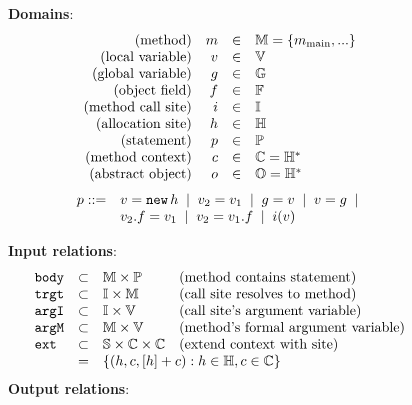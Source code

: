 \begin{figure*}
\begin{minipage}{3.3in}
{\bf Domains}: \\
\[
\begin{array}{rrcl}
\mbox{{(method)}}                  & m   &\in & {\mathbb M} = \{ m_\text{main}, ... \}\\
\mbox{{(local variable)}}          & v   &\in & {\mathbb V} \\
\mbox{{(global variable)}}         & g   &\in & {\mathbb G}  \\
\mbox{{(object field)}}            & f   &\in & {\mathbb F}  \\
\mbox{{(method call site)}}        & i   &\in & {\mathbb I} \\
\mbox{{(allocation site)}}         & h   &\in & {\mathbb H} \\
\mbox{{(statement)}}               & p   &\in & {\mathbb P} \\
\mbox{{(method context)}}          & c   &\in& {\mathbb C} = {\mathbb H}^* \\
\mbox{{(abstract object)}}         & o   &\in& {\mathbb O} = {\mathbb H}^* \\
\end{array}
\]
\[
\begin{array}{ll}
p ::= & v = \text{\tt new}\,h \;\mid\; v_2 = v_1 \;\mid\; g = v \;\mid\; v = g \;\mid\; \\
      & v_2.f = v_1 \;\mid\; v_2 = v_1.f  \;\mid\; i(v)
\end{array}
\]
\end{minipage}
\begin{minipage}{3.7in}
{\bf Input relations}: \\
\[ \begin{array}{lcll}
\body     &\subset& \M \times \P & \text{(method contains statement)} \\
\trgt     &\subset& \I \times \M & \text{(call site resolves to method)} \\
\argI     &\subset& \I \times \V & \text{(call site's argument variable)} \\
\argM     &\subset& \M \times \V & \text{(method's formal argument variable)} \\
\ext      &\subset& \S \times \C \times \C & \text{(extend context with site)} \\
          & =     & \multicolumn{2}{l}{\{ (h, c, [h]+c) : h\in\H, c\in\C \}} \\
\end{array}
\]
{\bf Output relations}: \\
\[ \begin{array}{lcll}

\end{array}\]
\end{minipage}
\end{figure*}
